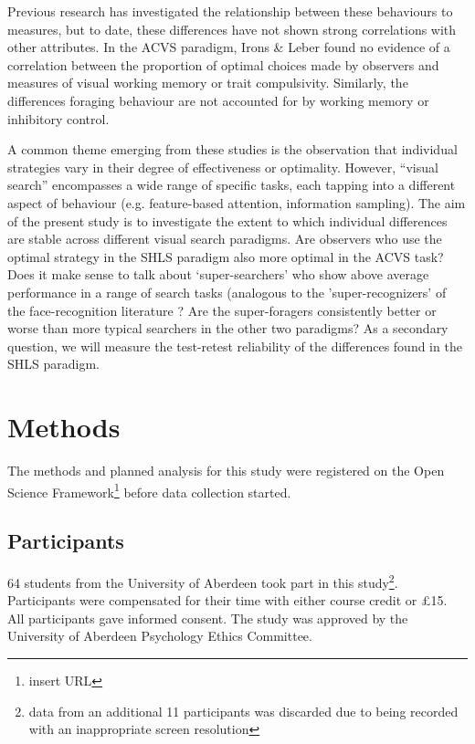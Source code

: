 \documentclass[]{rsos}%
\begin{document}
Previous research has investigated the relationship between these behaviours to  measures, but to date, these differences have not shown strong correlations with other attributes. In the ACVS paradigm, Irons \& Leber found no evidence of a correlation between the proportion of optimal choices made by observers and measures of visual working memory or trait compulsivity\cite{irons-leber2016}. Similarly, the differences foraging behaviour are not accounted for by working memory or inhibitory control\cite{johannesson2017}. 

A common theme emerging from these studies is the observation that individual strategies vary in their degree of effectiveness or optimality. However, ``visual search'' encompasses a wide range of specific tasks, each tapping into a different aspect of behaviour (e.g. feature-based attention, information sampling). The aim of the present study is to investigate the extent to which individual differences are stable across different visual search paradigms. Are observers who use the optimal strategy in the SHLS paradigm also more optimal in the ACVS task? Does it make sense to talk about `super-searchers' who show above average performance in a range of search tasks (analogous to the 'super-recognizers' of the face-recognition literature \cite{russell2009}? Are the super-foragers consistently better or worse than more typical searchers in the other two paradigms? As a secondary question, we will measure the test-retest reliability of the differences found in the SHLS paradigm. 

\section{Methods}

The methods and planned analysis for this study were registered on the Open Science Framework\footnote{insert URL} before data collection started.

\subsection{Participants}
64 students from the University of Aberdeen took part in this study\footnote{data from an additional 11 participants was discarded due to being recorded with an inappropriate screen resolution}. Participants were compensated for their time with either  course credit or \pounds 15. All participants gave informed consent. The study was approved by the University of Aberdeen Psychology Ethics Committee. 
\end{document}
